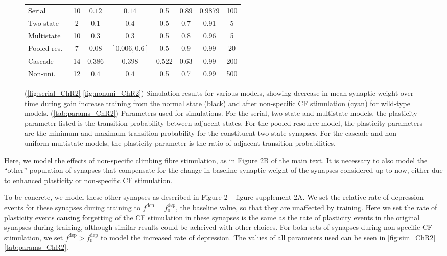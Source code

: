 \documentclass[10pt]{article}
\renewenvironment{myenumA}{\begin{inparaenum}[\bfseries A]}{\end{inparaenum}}
\newcommand{\dep}{^{\text{dep}}}
\newcommand{\norm}{_0}
\newcommand{\chrfig}[1][B]{Figure 2#1 of the main text}
\newcommand{\compfig}[1][A]{Figure 2 -- figure supplement 2#1}
\begin{document}
\begin{figure}
\begin{preview}
\begin{myenumA}
{\begin{tabular}{|l|c|c|c|c|c|c|c|}
    \cline{1-8}
    Serial       & 10 & $0.12$  & $0.14$        & 0.5   & 0.89 & 0.9879 & 100 \\
    Two-state    & 2  & $0.1$   & $0.4$         & 0.5   & 0.7  & 0.91   & 5   \\
    Multistate   & 10 & $0.3$   & $0.3$         & 0.5   & 0.8  & 0.96   & 5   \\
    Pooled res.\ & 7  & $0.08$  & $[0.006,0.6]$ & 0.5   & 0.9  & 0.99   & 20  \\
    Cascade      & 14 & $0.386$ & $0.398$       & 0.522 & 0.63 & 0.99   & 200  \\
    Non-uni.\    & 12 & $0.4$   & $0.4$         & 0.5   & 0.7  & 0.99   & 500  \\
    \cline{1-8}
  \end{tabular}}
  \end{myenumA}
\end{preview}
  \caption[Simulation results for various models]{(\ref{fig:serial_ChR2}-\ref{fig:nonuni_ChR2}) Simulation results for various models, showing decrease in mean synaptic weight over time during gain increase training from the normal state (black) and after non-specific CF stimulation (cyan) for wild-type models.
  (\ref{tab:params_ChR2}) Parameters used for simulations.
  For the serial, two state and multistate models, the plasticity parameter listed is the transition probability between adjacent states.
  For the pooled resource model, the plasticity parameters are the minimum and maximum transition probability for the constituent two-state synapses.
  For the cascade and non-uniform multistate models, the plasticity parameter is the ratio of adjacent transition probabilities.}\label{fig:sim_ChR2}
\end{figure}


Here, we model the effects of non-specific climbing fibre stimulation, as in \chrfig.
It is necessary to also model the ``other'' population of synapses that compensate for the change in baseline synaptic weight of the synapses considered up to now, either due to enhanced plasticity or non-specific CF stimulation.

To be concrete, we model these other synapses as described in \compfig.
We set the relative rate of depression events for these synapses during training to $f\dep = f\dep\norm$, \ie the baseline value, so that they are unaffected by training.
Here we set the rate of plasticity events causing forgetting of the CF stimulation in these synapses is the same as the rate of plasticity events in the original synapses during training, although similar results could be acheived with other choices.
For both sets of synapses during non-specific CF stimulation, we set $f\dep > f\dep\norm$ to model the increased rate of depression.
The values of all parameters used can be seen in \autoref{fig:sim_ChR2}\ref{tab:params_ChR2}.
\end{document}
